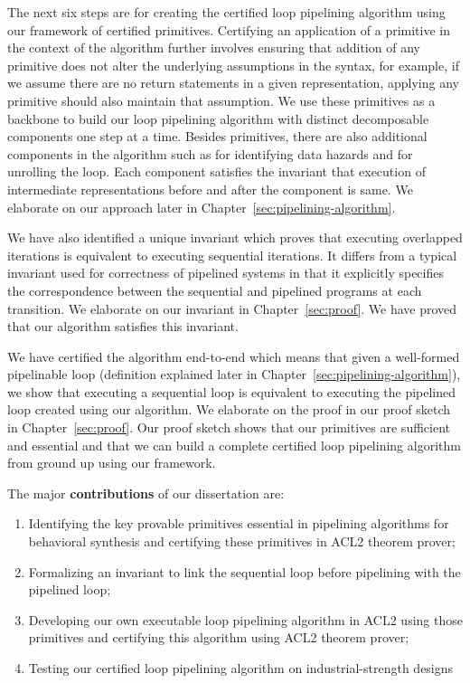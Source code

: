 The next six steps are for creating the certified loop pipelining algorithm using our framework of certified primitives. Certifying an application of a primitive in the context of the algorithm further involves ensuring that addition of any primitive does not alter the underlying assumptions in the syntax, for example, if we assume there are no return statements in a given representation, applying any primitive should also maintain that assumption. We use these primitives as a backbone to build our loop pipelining algorithm with distinct decomposable components one step at a time. Besides primitives, there are also additional components in the algorithm such as for identifying data hazards and for unrolling the loop. Each component satisfies the invariant that execution of intermediate representations before and after the component is same.  We elaborate on our approach later in Chapter~\ref{sec:pipelining-algorithm}.

We have also identified a unique invariant which proves that executing overlapped iterations is equivalent to executing sequential iterations. It differs from a typical invariant used for correctness of pipelined systems in that it explicitly specifies the correspondence between the sequential and pipelined programs at each transition.  We elaborate on our invariant in Chapter~\ref{sec:proof}. We have proved that our algorithm satisfies this invariant.

We have certified the algorithm end-to-end which means that given a well-formed pipelinable loop (definition explained later in Chapter~\ref{sec:pipelining-algorithm}), we show that executing a sequential loop is equivalent to executing the pipelined loop created using our algorithm. We elaborate on the proof in our proof sketch in Chapter~\ref{sec:proof}. Our proof sketch shows that our primitives are sufficient and essential and that we can build a complete certified loop pipelining algorithm from ground up using our framework.

The major \textbf{contributions} of our dissertation are:
\begin{enumerate}[--]
\item Identifying the key provable primitives essential in pipelining algorithms for behavioral synthesis and certifying these primitives in ACL2 theorem prover;
\item Formalizing an invariant to link the sequential loop before pipelining with the pipelined loop;
\item Developing our own executable loop pipelining algorithm in ACL2 using those primitives and certifying this algorithm using ACL2 theorem prover;
\item Testing our certified loop pipelining algorithm on industrial-strength designs
\end{enumerate}

